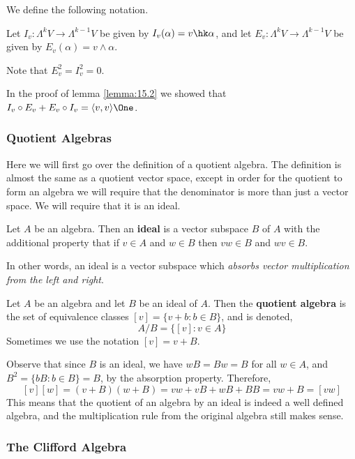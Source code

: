 \begin{defn}
    We define the following notation.

    Let $I_v : \Lambda^k V \to \Lambda^{k-1}V$ be given by $I_v(\alpha) = v\hk \alpha$, and let $E_v : \Lambda^k V \to \Lambda^{k-1}V$ be given by $E_v(\alpha) = v\wedge \alpha$.
\end{defn}
\begin{remark*}
    Note that $E_v^2 = I_v^2 = 0$.
\end{remark*}
\begin{cor}
    In the proof of lemma \ref{lemma:15.2} we showed that $I_v \circ E_v + E_v\circ I_v = \langle v,v\rangle\One$.
\end{cor}
\subsubsection{Quotient Algebras}
Here we will first go over the definition of a quotient algebra. The definition is almost the same as a quotient vector space, except in order for the quotient to form an algebra we will require that the denominator is more than just a vector space. We will require that it is an ideal.
\begin{defn}
    Let $A$ be an algebra. Then an \textbf{ideal} is a vector subspace $B$ of $A$ with the additional property that if $v\in A$ and $w \in B$ then $vw \in B$ and $wv\in B$.

    In other words, an ideal is a vector subspace which \textit{absorbs vector multiplication from the left and right}.
\end{defn}
\begin{defn}
    Let $A$ be an algebra and let $B$ be an ideal of $A$. Then the \textbf{quotient algebra} is the set of equivalence classes $[v] = \{v + b : b \in B\}$, and is denoted,
    \[A/B = \{[v] : v\in A\}\]
    Sometimes we use the notation $[v] = v+B$.
\end{defn}
\begin{remark*}
    Observe that since $B$ is an ideal, we have $wB = Bw = B$ for all $w\in A$, and $B^2 = \{bB : b \in B\} = B$, by the absorption property. Therefore,
    \[[v][w] = (v+B)(w+B) = vw+vB+wB+BB = vw + B = [vw]\]
    This means that the quotient of an algebra by an ideal is indeed a well defined algebra, and the multiplication rule from the original algebra still makes sense.
\end{remark*}

\subsubsection{The Clifford Algebra}

